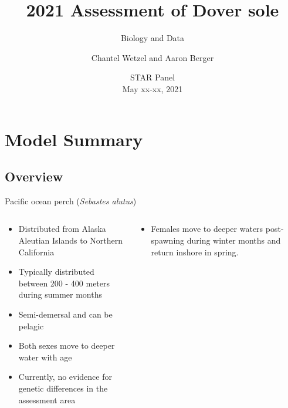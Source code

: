 \documentclass[pdf]{beamer}\usepackage[]{graphicx}\usepackage[]{color}
\title{2021 Assessment of Dover sole}
\subtitle{Biology and Data}
\author{Chantel Wetzel and Aaron Berger}
\institute[NWFSC]{
Northwest Fisheries Science Center \\
\medskip
}
\date{{\footnotesize STAR Panel \\ May xx-xx, 2021}}
\begin{document}
\begin{frame}
  \titlepage
\end{frame}


\section{Model Summary}
\subsection{Overview}
\begin{frame}{Pacific ocean perch (\textit{Sebastes alutus})}
\begin{columns}
  \begin{column}{0.5\textwidth}
      \begin{itemize}
        \item Distributed from  Alaska Aleutian Islands to Northern California
        \item Typically distributed between 200 - 400 meters during summer months
        \item Semi-demersal and can be pelagic
        \item Both sexes move to deeper water with age
        \item Currently, no evidence for genetic differences in the assessment area
      \end{itemize}
  \end{column}
  
  \begin{column}{0.5\textwidth}
    \begin{itemize}
        \item Females move to deeper waters post-spawning during winter months and return inshore in spring.
      \end{itemize}
  \end{column}
\end{columns}
\end{frame}

  
\end{document}
